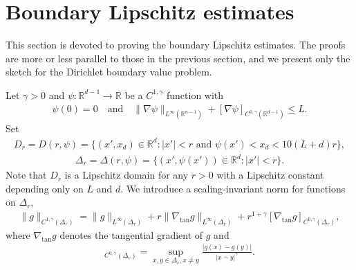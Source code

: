 \documentclass[reqno,12pt]{amsart} %
\theoremstyle{definition}
\theoremstyle{remark}
\numberwithin{equation}{section}
\newcommand{\R}{\mathbb{R}}
\begin{document}

\section{Boundary Lipschitz estimates}\label{sec_ext}

This section is devoted to proving the boundary Lipschitz estimates. The proofs are more or less parallel to those in the previous section, and we present only the sketch for the Dirichlet boundary value problem. 

Let $\gamma>0$ and $\psi:\mathbb{R}^{d-1}\rightarrow\mathbb{R}$ be a $C^{1,\gamma}$ function with
\begin{align}\label{ext_cond_psi}
  \psi(0)=0\quad\text{and}\quad\|\nabla\psi\|_{L^\infty(\R^{n-1})} +[\nabla\psi]_{C^{0,\gamma}(\mathbb{R}^{d-1})}\leq L.
\end{align}
Set
\begin{align*}
  D_r=D(r,\psi)=\{(x',x_d)\in\mathbb{R}^d: |x'|<r\text{~and~}\psi(x')<x_d<10(L+d)r\},
\end{align*}
\begin{align*}
  \Delta_{r}=\Delta(r,\psi)=\{(x',\psi(x'))\in\mathbb{R}^{d}:|x'|<r\}.
\end{align*}
Note that $D_r$ is a Lipschitz domain for any $r>0$ with a Lipschitz constant depending only on $L$ and $d$.
We introduce a scaling-invariant norm for functions on $\Delta_r$,
\begin{align*}
  \|g\|_{C^{1, \gamma}(\Delta_r)}=\|g\|_{L^\infty(\Delta_r)}+r\|\nabla_{\mathrm{tan}} g\|_{L^\infty(\Delta_r)}+r^{1+\gamma}[\nabla_{\mathrm{tan}}g]_{C^{0, \gamma}(\Delta_r)}, 
\end{align*}
where $\nabla_{\mathrm{tan}}g$ denotes the tangential gradient of $g$ and
\begin{align*}
  [g]_{C^{0, \gamma}(\Delta_r)}=\sup_{x, y\in \Delta_r, x\neq y}\frac{|g(x)-g(y)|}{|x-y|^\gamma}.
\end{align*}
\end{document}
